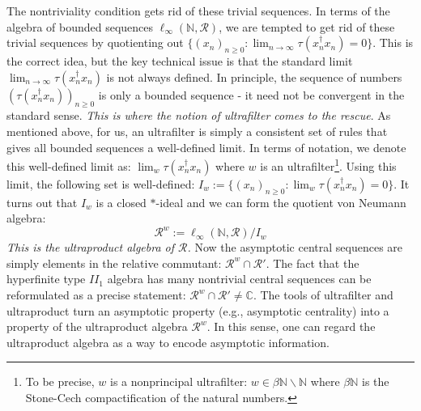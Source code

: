 \documentclass[a4paper,11pt]{article}
\theoremstyle{definition}
\numberwithin{equation}{section}
\begin{document}
The nontriviality condition gets rid of these trivial sequences. In terms of the algebra of bounded sequences $\ell_\infty(\mathbb{N}, \mathcal{R})$, we are tempted to get rid of these trivial sequences by quotienting out $\{(x_n)_{n\geq 0}:\lim_{n\rightarrow\infty}\tau(x^\dagger_nx_n) = 0\}$. This is the correct idea, but the key technical issue is that the standard limit $\lim_{n\rightarrow\infty}\tau(x^\dagger_nx_n)$ is not always defined. In principle, the sequence of numbers $(\tau(x^\dagger_nx_n))_{n\geq 0}$ is only a bounded sequence - it need not be convergent in the standard sense. \textit{This is where the notion of ultrafilter comes to the rescue}. As mentioned above, for us, an ultrafilter is simply a consistent set of rules that gives all bounded sequences a well-defined limit. In terms of notation, we denote this well-defined limit as: $\lim_{w}\tau(x^\dagger_nx_n)$ where $w$ is an ultrafilter\footnote{To be precise, $w$ is a nonprincipal ultrafilter: $w\in\beta\mathbb{N}\backslash\mathbb{N}$ where $\beta\mathbb{N}$ is the Stone-Cech compactification of the natural numbers.}. Using this limit, the following set is well-defined: $I_w := \{(x_n)_{n\geq 0}:\lim_w\tau(x^\dagger_nx_n) = 0\}$. It turns out that $I_w$ is a closed $*$-ideal and we can form the quotient von Neumann algebra:
\begin{equation}
    \mathcal{R}^w := \ell_\infty(\mathbb{N}, \mathcal{R}) / I_w
\end{equation}
\textit{This is the ultraproduct algebra of $\mathcal{R}$.} Now the asymptotic central sequences are simply elements in the relative commutant: $\mathcal{R}^w\cap\mathcal{R}'$. The fact that the hyperfinite type $II_1$ algebra has many nontrivial central sequences can be reformulated as a precise statement: $\mathcal{R}^w\cap \mathcal{R}' \neq\mathbb{C}$. The tools of ultrafilter and ultraproduct turn an asymptotic property (e.g., asymptotic centrality) into a property of the ultraproduct algebra $\mathcal{R}^w$. In this sense, one can regard the ultraproduct algebra as a way to encode asymptotic information. 
\end{document}
